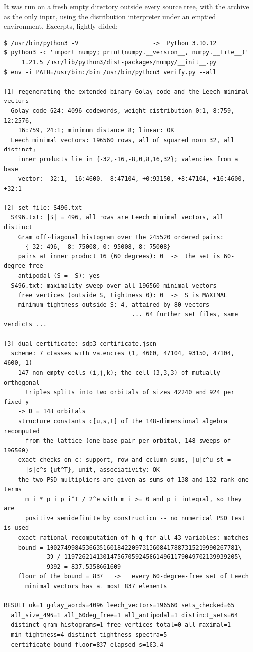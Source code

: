 \documentclass[10pt,a4paper]{article}
\begin{document}
It was run on a fresh empty directory outside every source tree, with the archive as the only
input, using the distribution interpreter under an emptied environment. Excerpts, lightly elided:

\newpage
{\footnotesize
\begin{verbatim}
$ /usr/bin/python3 -V                     ->  Python 3.10.12
$ python3 -c 'import numpy; print(numpy.__version__, numpy.__file__)'
     1.21.5 /usr/lib/python3/dist-packages/numpy/__init__.py
$ env -i PATH=/usr/bin:/bin /usr/bin/python3 verify.py --all

[1] regenerating the extended binary Golay code and the Leech minimal vectors
  Golay code G24: 4096 codewords, weight distribution 0:1, 8:759, 12:2576,
    16:759, 24:1; minimum distance 8; linear: OK
  Leech minimal vectors: 196560 rows, all of squared norm 32, all distinct;
    inner products lie in {-32,-16,-8,0,8,16,32}; valencies from a base
    vector: -32:1, -16:4600, -8:47104, +0:93150, +8:47104, +16:4600, +32:1

[2] set file: S496.txt
  S496.txt: |S| = 496, all rows are Leech minimal vectors, all distinct
    Gram off-diagonal histogram over the 245520 ordered pairs:
      {-32: 496, -8: 75008, 0: 95008, 8: 75008}
    pairs at inner product 16 (60 degrees): 0  ->  the set is 60-degree-free
    antipodal (S = -S): yes
  S496.txt: maximality sweep over all 196560 minimal vectors
    free vertices (outside S, tightness 0): 0  ->  S is MAXIMAL
    minimum tightness outside S: 4, attained by 80 vectors
                                    ... 64 further set files, same verdicts ...

[3] dual certificate: sdp3_certificate.json
  scheme: 7 classes with valencies (1, 4600, 47104, 93150, 47104, 4600, 1)
    147 non-empty cells (i,j,k); the cell (3,3,3) of mutually orthogonal
      triples splits into two orbitals of sizes 42240 and 924 per fixed y
    -> D = 148 orbitals
    structure constants c[u,s,t] of the 148-dimensional algebra recomputed
      from the lattice (one base pair per orbital, 148 sweeps of 196560)
    exact checks on c: support, row and column sums, |u|c^u_st =
      |s|c^s_{ut^T}, unit, associativity: OK
    the two PSD multipliers are given as sums of 138 and 132 rank-one terms
      m_i * p_i p_i^T / 2^e with m_i >= 0 and p_i integral, so they are
      positive semidefinite by construction -- no numerical PSD test is used
    exact rational recomputation of h_q for all 43 variables: matches
    bound = 100274998453663516018422097313608417887315219990267781\
            39 / 1197262141301475670592458614961179049702139939205\
            9392 = 837.5358661609
    floor of the bound = 837   ->   every 60-degree-free set of Leech
      minimal vectors has at most 837 elements

RESULT ok=1 golay_words=4096 leech_vectors=196560 sets_checked=65
  all_size_496=1 all_60deg_free=1 all_antipodal=1 distinct_sets=64
  distinct_gram_histograms=1 free_vertices_total=0 all_maximal=1
  min_tightness=4 distinct_tightness_spectra=5
  certificate_bound_floor=837 elapsed_s=103.4
\end{verbatim}
}
\end{document}
